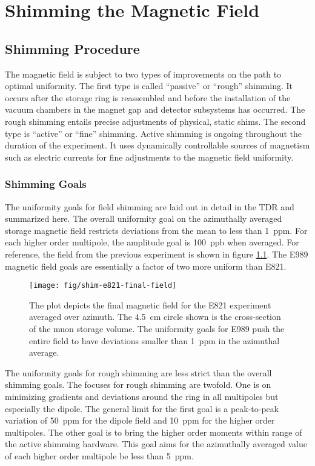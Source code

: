 \chapter {Shimming the Magnetic Field} \label{ch:shimming}

\section{Shimming Procedure}

The \gmtwo magnetic field is subject to two types of improvements on the path to optimal uniformity.  The first type is called ``passive'' or ``rough'' shimming.  It occurs after the storage ring is reassembled and before the installation of the vacuum chambers in the magnet gap and detector subsystems has occurred. The rough shimming entails precise adjustments of physical, static shims. The second type is ``active'' or ``fine'' shimming.  Active shimming is ongoing throughout the duration of the experiment.  It uses dynamically controllable sources of magnetism such as electric currents for fine adjustments to the magnetic field uniformity.

\subsection{Shimming Goals}
The uniformity goals for field shimming are laid out in detail in the TDR \cite{e989-tdr} and summarized here.  The overall uniformity goal on the azimuthally averaged storage magnetic field restricts deviations from the mean to less than \SI{1}{ppm}.  For each higher order multipole, the amplitude goal is \SI{100}{ppb} when averaged.  For reference, the field from the previous experiment is shown in figure \ref{fig:shim-e821-final-field}.  The E989 magnetic field goals are essentially a factor of two more uniform than E821.

\begin{figure}
\centering
\texttt{[image: fig/shim-e821-final-field]}
\caption{
    The plot depicts the final magnetic field for the E821 \gmtwo experiment averaged over azimuth.  The \SI{4.5}{\cm} circle shown is the cross-section of the muon storage volume.  The uniformity goals for E989 push the entire field to have deviations smaller than \SI{1}{ppm} in the azimuthal average. 
    \label{fig:shim-e821-final-field}
}
\end{figure}

The uniformity goals for rough shimming are less strict than the overall shimming goals.  The focuses for rough shimming are twofold. One is on minimizing gradients and deviations around the ring in all multipoles but especially the dipole.  The general limit for the first goal is a peak-to-peak variation of \SI{50}{ppm} for the dipole field and \SI{10}{ppm} for the higher order multipoles.  The other goal is to bring the higher order moments within range of the active shimming hardware.  This goal aims for the azimuthally averaged value of each higher order multipole be less than \SI{5}{ppm}.

